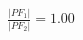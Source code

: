 \documentclass[preview]{standalone}
\begin{document}
\begin{align*}
\frac{|PF_1|}{|PF_2|} = 1.00
\end{align*}
\end{document}
